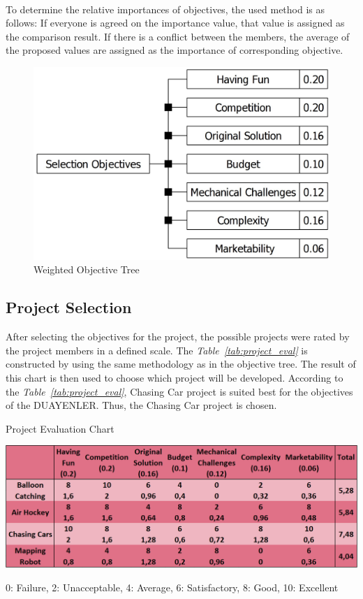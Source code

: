\documentclass[a4paper,12pt]{article}
\begin{document}
	\- \\To determine the relative importances of objectives, the used method is as follows: If everyone is agreed on the importance value, that value is assigned as the comparison result. If there is a conflict between the members, the average of the proposed values are assigned as the importance of corresponding objective.
	\begin{figure}[H]
		\centering
		\includegraphics[width=.6\textwidth]{pre-objective-tree/pre-objective-tree} 
		\caption{\label{fig:objective_tree}Weighted Objective Tree}
	\end{figure}
	
	
	\subsection{Project Selection}	
	
		After selecting the objectives for the project, the possible projects were rated by the project members in a defined scale. The \textit{Table~\ref{tab:project_eval}} is constructed by using the same methodology as in the objective tree. The result of this chart is then used to choose which project will be developed. According to the \textit{Table~\ref{tab:project_eval}}, Chasing Car project is suited best for the objectives of the DUAYENLER. Thus, the Chasing Car project is chosen.
		
	\begin{table}[H]
		\centering
		\caption{\label{tab:project_eval}Project Evaluation Chart}\vspace{-.2cm}
		\includegraphics[width=\textwidth,height=\textheight,keepaspectratio]{images/project_evaluation4} 
	\vspace*{-.9cm}	\begin{center}
		{\small 0: Failure, 2: Unacceptable, 4: Average, 6: Satisfactory, 8: Good, 10: Excellent }	
		\end{center}
	\end{table}	\vspace*{-.5cm}	
	
\end{document}

